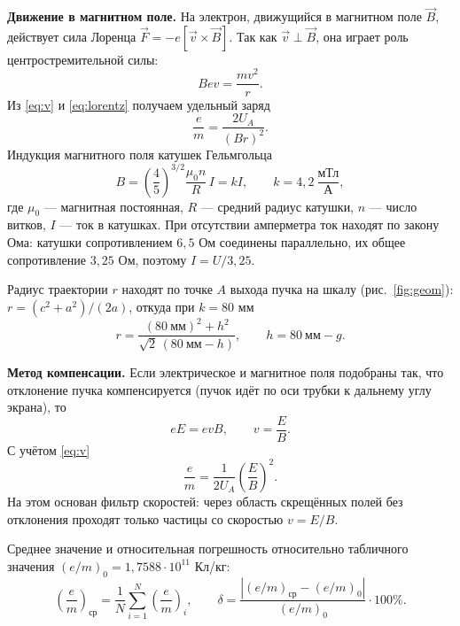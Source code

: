 \documentclass[12pt, a4paper]{article}
\begin{document}
	\textbf{Движение в магнитном поле.} На электрон, движущийся в магнитном поле $\vec B$, действует сила Лоренца $\vec F = -e[\vec v \times \vec B]$. Так как $\vec v \perp \vec B$, она играет роль центростремительной силы:
	\begin{equation}
		Bev = \frac{mv^2}{r}.
		\label{eq:lorentz}
	\end{equation}
	Из \eqref{eq:v} и \eqref{eq:lorentz} получаем удельный заряд
	\begin{equation}
		\frac{e}{m} = \frac{2U_A}{(Br)^2}.
		\label{eq:em}
	\end{equation}
	Индукция магнитного поля катушек Гельмгольца
	\begin{equation}
		B = \left(\frac{4}{5}\right)^{3/2}\frac{\mu_0 n}{R}\,I = kI, \qquad k = 4{,}2\ \frac{\text{мТл}}{\text{А}},
		\label{eq:B}
	\end{equation}
	где $\mu_0$ --- магнитная постоянная, $R$ --- средний радиус катушки, $n$ --- число витков, $I$ --- ток в катушках. При отсутствии амперметра ток находят по закону Ома: катушки сопротивлением $6{,}5$ Ом соединены параллельно, их общее сопротивление $3{,}25$ Ом, поэтому $I = U/3{,}25$.
	
	Радиус траектории $r$ находят по точке $A$ выхода пучка на шкалу (рис.~\ref{fig:geom}): $r = (c^2 + a^2)/(2a)$, откуда при $k = 80$ мм
	\begin{equation}
		r = \frac{(80\ \text{мм})^2 + h^2}{\sqrt{2}\,(80\ \text{мм} - h)}, \qquad h = 80\ \text{мм} - g.
		\label{eq:r}
	\end{equation}
	
	\textbf{Метод компенсации.} Если электрическое и магнитное поля подобраны так, что отклонение пучка компенсируется (пучок идёт по оси трубки к дальнему углу экрана), то
	\begin{equation}
		eE = evB, \qquad v = \frac{E}{B}.
		\label{eq:comp}
	\end{equation}
	С учётом \eqref{eq:v}
	\begin{equation}
		\frac{e}{m} = \frac{1}{2U_A}\left(\frac{E}{B}\right)^2.
		\label{eq:emcomp}
	\end{equation}
	На этом основан фильтр скоростей: через область скрещённых полей без отклонения проходят только частицы со скоростью $v = E/B$.
	
	\newpage
	Среднее значение и относительная погрешность относительно табличного значения $(e/m)_0 = 1{,}7588 \cdot 10^{11}$ Кл/кг:
	\begin{equation}
		\left(\frac{e}{m}\right)_{\text{ср}} = \frac{1}{N}\sum_{i=1}^{N}\left(\frac{e}{m}\right)_i, \qquad
		\delta = \frac{\left|(e/m)_{\text{ср}} - (e/m)_0\right|}{(e/m)_0}\cdot 100\%.
		\label{eq:delta}
	\end{equation}
	
\end{document}
